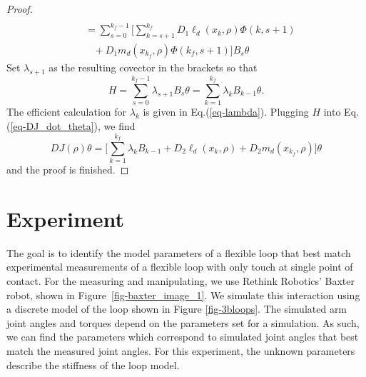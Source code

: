 \documentclass[letterpaper, 10pt, conference]{ieeeconf}
\begin{document}
\begin{proof}
\[\begin{array}{l}
\\\hspace{10pt} = \sum_{s=0}^{k_f-1}\Big[\sum_{k = s+1}^{k_f}D_1\ell_d(x_k,\rho) \Phi(k,s+1) \\\hspace{20pt}+ D_1m_d(x_{k_f},\rho)\Phi(k_f,s+1)\Big]B_s\theta
\end{array}
\]
Set $\lambda_{s+1}$ as the resulting covector in the brackets so that 
\[
H = \sum_{s=0}^{k_f-1} \lambda_{s+1} B_s\theta = \sum_{k=1}^{k_f} \lambda_{k} B_{k-1}\theta.
\]
The efficient calculation for $\lambda_k$ is given in Eq.(\ref{eq-lambda}).  Plugging $H$ into Eq.(\ref{eq-DJ_dot_theta}), we find
\[
DJ(\rho)\theta = \Big[\sum_{k = 1}^{k_f}\lambda_kB_{k-1} +D_2\ell_d(x_k,\rho) + D_2m_d(x_{k_f},\rho)\Big]\theta
\]
and the proof is finished.
\end{proof}

\section{Experiment}
\label{sec-experiment}


\begin{figure*}
\centering
\def\svgwidth{.97\textwidth}

\caption{Three distinct configurations.  \textbf{a)} The frames for Baxter and the loop in their initial configuration. \textbf{b)} Baxter ``twisting'' the loop. \textbf{c)} Baxter ``bending'' the loop.}
\label{fig-3bloops}
\end{figure*}


The goal is to identify the model parameters of a flexible loop that best match experimental measurements of a flexible loop with only touch at single point of contact.  For the measuring and manipulating, we use Rethink Robotics' Baxter robot, shown in Figure~\ref{fig-baxter_image_1}. We simulate this interaction using a discrete model of the loop shown in Figure \ref{fig-3bloops}. The simulated arm joint angles and torques depend on the parameters set for a simulation.  As such, we can find the parameters which correspond to simulated joint angles that best match the measured joint angles.  For this experiment, the unknown parameters describe the stiffness of the loop model.
\end{document}
